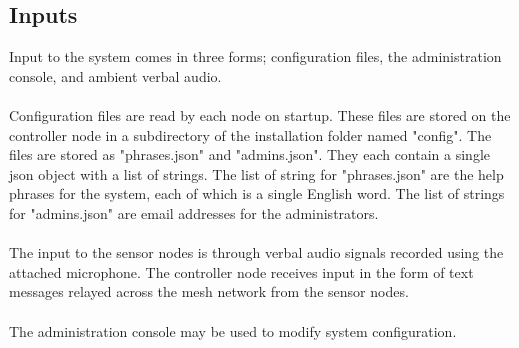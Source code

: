 \documentclass[11pt,a4paper]{article}
\begin{document}
\subsection{Inputs}
Input to the system comes in three forms; configuration files, the administration console, and ambient verbal audio. \\\\
Configuration files are read by each node on startup. These files are stored on the controller node in a subdirectory of the installation folder named "config".  The files are stored as "phrases.json" and "admins.json". They each contain a single json object with a list of strings. The list of string for "phrases.json" are the help phrases for the system, each of which is a single English word. The list of strings for "admins.json" are email addresses for the administrators. \\\\
The input to the sensor nodes is through verbal audio signals recorded using the attached microphone.  The controller node receives input in the form of text messages relayed across the mesh network from the sensor nodes. \\\\
The administration console may be used to modify system configuration.
\end{document}
